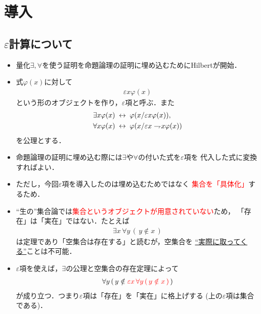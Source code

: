 \section{導入}
\subsection{$\varepsilon$計算について}
	\begin{itemize}
	\setlength{\itemsep}{10pt}
		\item 量化$\exists,\forall$を使う証明を命題論理の証明に埋め込むためにHilbertが開始．
		
		\item 式$\varphi(x)$に対して
			\begin{align}
				\varepsilon x \varphi(x)
			\end{align}
			という形のオブジェクトを作り，$\varepsilon$項と呼ぶ．また
			\begin{align}
				\exists x \varphi(x) &\hspace{0.25em}\leftrightarrow\hspace{0.25em} \varphi(x/\varepsilon x \varphi(x)), \\
				\forall x \varphi(x) &\hspace{0.25em}\leftrightarrow\hspace{0.25em} \varphi(x/\varepsilon x \rightharpoondown\hspace{-0.25em} x \varphi(x))
			\end{align}
			を公理とする．
			
		\item 命題論理の証明に埋め込む際には$\exists$や$\forall$の付いた式を$\varepsilon$項を
			代入した式に変換すればよい．
			
		\item ただし，今回$\varepsilon$項を導入したのは埋め込むためではなく
			\textcolor{red}{集合を「具体化」}するため．
	\end{itemize}
	
\newpage
	\begin{itemize}
	\setlength{\itemsep}{10pt}
		\item ``生の''集合論では\textcolor{red}{集合というオブジェクトが用意されていない}ため，
			「存在」は「実在」ではない．たとえば
			\begin{align}
				\exists x\, \forall y\, (\, y \notin x\, )
			\end{align}
			は定理であり「空集合は存在する」と読むが，空集合を
			\underline{``実際に取ってくる''}ことは不可能．
			
		\item $\varepsilon$項を使えば，$\exists$の公理と空集合の存在定理によって
			\begin{align}
				\forall y\, (\, y \notin \color{red}{\varepsilon x\, \forall y\, (\, y \notin x\, )}\, \color{black}{)}
			\end{align}
			が成り立つ．つまり$\varepsilon$項は「存在」を「実在」に格上げする
			(上の$\varepsilon$項は集合である)．
	\end{itemize}
	
